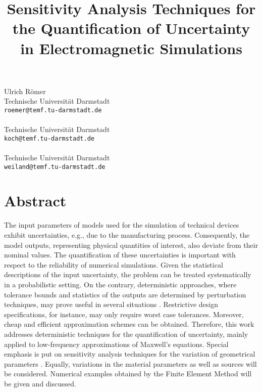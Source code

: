 \title{Sensitivity Analysis Techniques for the Quantification of Uncertainty in Electromagnetic Simulations}
 \author{} \institute{}
\maketitle
\begin{center}
{\large Ulrich R\"omer}\\
Technische Universit\"at Darmstadt\\
{\tt roemer@temf.tu-darmstadt.de}
\\ \vspace{4mm}{\large Stephan Koch}\\
Technische Universit\"at Darmstadt\\
{\tt koch@temf.tu-darmstadt.de}
\\ \vspace{4mm}{\large Thomas Weiland}\\
Technische Universit\"at Darmstadt\\
{\tt weiland@temf.tu-darmstadt.de}

\end{center}

\section*{Abstract}

The input parameters of models used for the simulation of technical devices exhibit uncertainties, e.g., due to the manufacturing process. Consequently, the model outputs, representing physical quantities of interest, also deviate from their nominal values. The quantification of these uncertainties is important with respect to the reliability of numerical simulations. Given the statistical descriptions of the input uncertainty, the problem can be treated systematically in a probabilistic setting. On the contrary, deterministic approaches, where tolerance bounds and statistics of the outputs are determined by perturbation techniques, may prove useful in several situations \cite{Babuska,Harbrecht}. Restrictive design specifications, for instance, may only require worst case tolerances. Moreover, cheap and efficient approximation schemes can be obtained. Therefore, this work addresses deterministic techniques for the quantification of uncertainty, mainly applied to low-frequency approximations of Maxwell's equations. Special emphasis is put on sensitivity analysis techniques for the variation of geometrical parameters \cite{Hiptmair}. Equally, variations in the material parameters as well as sources will be considered. Numerical examples obtained by the Finite Element Method will be given and discussed.

